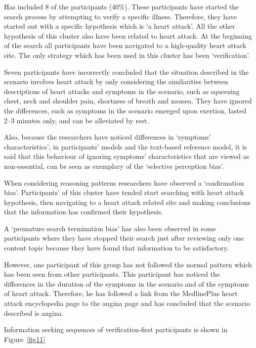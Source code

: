 \documentclass[]{article}
\begin{document}
Has included 8 of the participants (40\%). These participants have started the search process by attempting to verify a specific illness. Therefore, they have started out with a specific hypothesis which is ‘a heart attack’. All the other hypothesis of this cluster also have been related to heart attack. At the beginning of the search all participants have been navigated to a high-quality heart attack site. The only strategy which has been used in this cluster has been ‘verification’. 

Seven participants have incorrectly concluded that the situation described in the scenario involves heart attack by only considering the similarities between descriptions of heart attacks and symptoms in the scenario, such as squeezing chest, neck and shoulder pain, shortness of breath and nausea. They have ignored the differences, such as symptoms in the scenario emerged upon exertion, lasted 2–3 minutes only, and can be alleviated by rest. 

Also, because the researchers have noticed differences in ‘symptoms’ characteristics’, in participants’ models and the text-based reference model, it is said that this behaviour of ignoring symptoms’ characteristics that are viewed as non-essential, can be seen as exemplary of the ‘selective perception bias’. 

When considering reasoning patterns researchers have observed a ‘confirmation bias’. Participants’ of this cluster have tended start searching with heart attack hypothesis, then navigating to a heart attack related site and making conclusions that the information has confirmed their hypothesis. 

A ‘premature search termination bias’ has also been observed in some participants where they have stopped their search just after reviewing only one content topic because they have found that information to be satisfactory. 

However, one participant of this group has not followed the normal pattern which has been seen from other participants. This participant has noticed the differences in the duration of the symptoms in the scenario and of the symptoms of heart attack. Therefore, he has followed a link from the MedlinePlus heart attack encyclopedia page to the angina page and has concluded that the scenario described is angina. 

Information seeking sequences of verification-first participants is shown in Figure~\ref{fig11}
\end{document}
